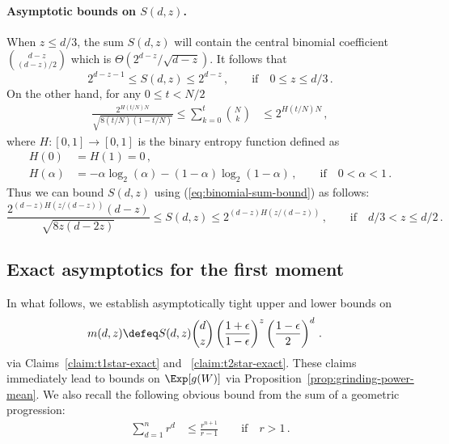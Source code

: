 \paragraph{Asymptotic bounds on $S(d,z)$.} 
When $z \leq d/3$, the sum $S(d,z)$ will contain the central binomial coefficient ${d-z \choose (d-z)/2}$ which is $\Theta(2^{d-z}/\sqrt{d-z})$. 
It follows that 
\begin{equation} \label{eq:S_d_z_small}
    2^{d-z-1} 
    \leq 
    S(d,z)
    \leq 2^{d-z}\,, 
    \qquad \text{if}\quad 0 \leq z \leq d/3 
    \,.
\end{equation}
On the other hand, for any $0 \leq t < N/2$
\begin{align}\label{eq:binomial-sum-bound}
\frac{2^{H(t/N)N} }{\sqrt{8 (t/N) (1-t/N)} }
\leq 
\sum_{k=0}^t{ {N \choose k} } 
&\leq 
2^{H(t/N)N} \, , 
\end{align}
where $H : [0, 1] \rightarrow [0, 1]$ is the binary entropy function defined as
\begin{align*}
    H(0) &= H(1) = 0\, , \\
    H(\alpha) &= -\alpha \log_2(\alpha) - (1-\alpha) \log_2(1-\alpha)\,, 
        \qquad \text{if}\quad 0 < \alpha < 1\, .
\end{align*}
Thus we can bound $S(d,z)$ using (\ref{eq:binomial-sum-bound}) as follows:
\begin{equation} \label{eq:S_d_z_large}
    \frac{2^{(d-z)H(z/(d-z))}(d-z)}{\sqrt{8 z(d-2z) }}
    \leq
    S(d, z) 
    \leq
    2^{(d-z)H(z/(d-z))}
    \,,\qquad \text{if} \quad d/3 < z \leq d/2 
    \,.
\end{equation}


\subsection{Exact asymptotics for the first moment}
\newcommand{\DoverTwo}{\lfloor d/2 \rfloor}
\newcommand{\DoverThree}{d/3}

In what follows, we establish asymptotically tight upper and lower bounds on 
\begin{align}\label{eq:m_z}
m(d,z) 
&\defeq S(d,z) {d \choose z} \left(\frac{1+\epsilon}{1-\epsilon}\right)^{z} \left(\frac{1-\epsilon}{2}\right)^{d} \, .
\end{align}
via Claims~\ref{claim:t1star-exact} and ~\ref{claim:t2star-exact}. These claims immediately lead to bounds on $\Exp[ g(W) ]$ via Proposition~\ref{prop:grinding-power-mean}.
We also recall the following obvious bound from the sum of a geometric progression:
\begin{align}\label{eq:geom-series-bound}
\sum_{d=1}^n{r^d} 
&\leq \frac{r^{n+1}}{r-1} \qquad \text{if}\quad r > 1\, .
\end{align}





